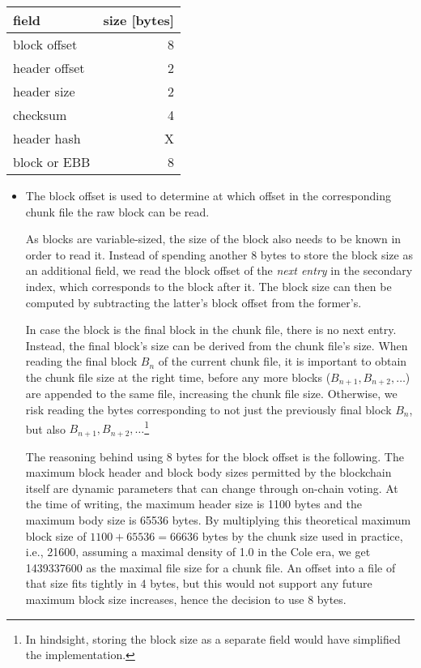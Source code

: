 \begin{center}
\begin{tabular}{l r}
  field & size [bytes] \\
  \hline
  block offset  & 8 \\
  header offset & 2 \\
  header size   & 2 \\
  checksum      & 4 \\
  header hash   & X \\
  block or EBB  & 8 \\
\end{tabular}
\end{center}

\begin{itemize}
\item The block offset is used to determine at which offset in the corresponding
  chunk file the raw block can be read.

  As blocks are variable-sized, the size of the block also needs to be known in
  order to read it. Instead of spending another 8 bytes to store the block size
  as an additional field, we read the block offset of the \emph{next entry} in
  the secondary index, which corresponds to the block after it. The block size
  can then be computed by subtracting the latter's block offset from the
  former's.

  In case the block is the final block in the chunk file, there is no next
  entry. Instead, the final block's size can be derived from the chunk file's
  size. When reading the final block $B_n$ of the current chunk file, it is
  important to obtain the chunk file size at the right time, before any more
  blocks ($B_{n+1}, B_{n+2}, \ldots$) are appended to the same file, increasing the
  chunk file size. Otherwise, we risk reading the bytes corresponding to not
  just the previously final block $B_n$, but also $B_{n+1}, B_{n+2},
  \ldots$\footnote{In hindsight, storing the block size as a separate field would
  have simplified the implementation.}

  The reasoning behind using 8 bytes for the block offset is the following. The
  maximum block header and block body sizes permitted by the blockchain itself
  are dynamic parameters that can change through on-chain voting. At the time of
  writing, the maximum header size is 1100 bytes and the maximum body size is
  \num{65536} bytes. By multiplying this theoretical maximum block size of
  $\num{1100} + \num{65536} = \num{66636}$ bytes by the chunk size used in
  practice, i.e., \num{21600}, assuming a maximal density of 1.0 in the Cole
  era, we get \num{1439337600} as the maximal file size for a chunk file. An
  offset into a file of that size fits tightly in 4 bytes, but this would not
  support any future maximum block size increases, hence the decision to use 8
  bytes.


\end{itemize}

